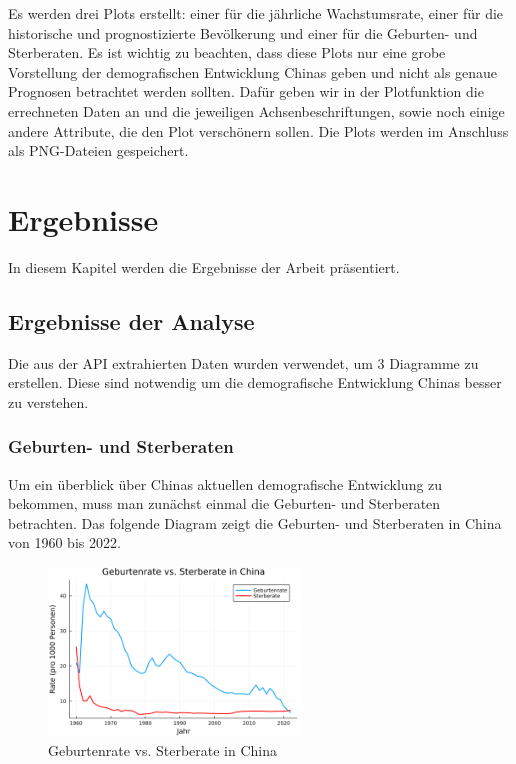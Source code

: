 Es werden drei Plots erstellt: einer für die jährliche Wachstumsrate, einer für die historische und prognostizierte Bevölkerung und einer für die Geburten- und Sterberaten. Es ist wichtig zu beachten, dass diese Plots nur eine grobe Vorstellung der demografischen Entwicklung Chinas geben und nicht als genaue Prognosen betrachtet werden sollten. Dafür geben wir in der Plotfunktion die errechneten Daten an und die jeweiligen Achsenbeschriftungen, sowie noch einige andere Attribute, die den Plot verschönern sollen. Die Plots werden im Anschluss als PNG-Dateien gespeichert.


\section{Ergebnisse}
In diesem Kapitel werden die Ergebnisse der Arbeit präsentiert.

\subsection{Ergebnisse der Analyse}
Die aus der API extrahierten Daten wurden verwendet, um 3 Diagramme zu erstellen. Diese sind notwendig um die demografische Entwicklung Chinas besser zu verstehen.

\subsubsection{Geburten- und Sterberaten}
Um ein überblick über Chinas aktuellen demografische Entwicklung zu bekommen, muss man zunächst einmal die Geburten- und Sterberaten betrachten. Das folgende Diagram zeigt die Geburten- und Sterberaten in China von 1960 bis 2022.

\begin{figure}[H]
    \centering
    \includegraphics[width=0.6\textwidth]{geburtenrate_vs_sterberate_china.png}
    \caption{Geburtenrate vs. Sterberate in China}
    \label{fig:geburtenrate_vs_sterberate_china}
\end{figure}


